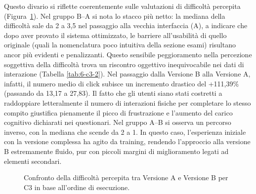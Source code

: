 Questo divario si riflette coerentemente sulle valutazioni di difficoltà percepita (Figura~\ref{fig:6-c3-2}). Nel gruppo B--A si nota lo stacco più netto: la mediana della difficoltà sale da 2 a 3,5 nel passaggio alla vecchia interfaccia (A), a indicare che dopo aver provato il sistema ottimizzato, le barriere all'usabilità di quello originale (quali la nomenclatura poco intuitiva della sezione esami) risultano ancor più evidenti e penalizzanti. Questo sensibile peggioramento nella percezione soggettiva della difficoltà trova un riscontro oggettivo inequivocabile nei dati di interazione (Tabella \ref{tab:6-c3-2}). Nel passaggio dalla Versione B alla Versione A, infatti, il numero medio di click subisce un incremento drastico del +111,39\% (passando da 13,17 a 27,83). Il fatto che gli utenti siano stati costretti a raddoppiare letteralmente il numero di interazioni fisiche per completare lo stesso compito giustifica pienamente il picco di frustrazione e l'aumento del carico cognitivo dichiarati nei questionari. Nel gruppo A--B si osserva un percorso inverso, con la mediana che scende da 2 a 1. In questo caso, l'esperienza iniziale con la versione complessa ha agito da training, rendendo l'approccio alla versione B estremamente fluido, pur con piccoli margini di miglioramento legati ad elementi secondari.

\begin{figure}[H]
	\centering
	\caption{Confronto della difficoltà percepita tra Versione A e Versione B per C3 in base all'ordine di esecuzione.}
	\label{fig:6-c3-2}
\end{figure}
